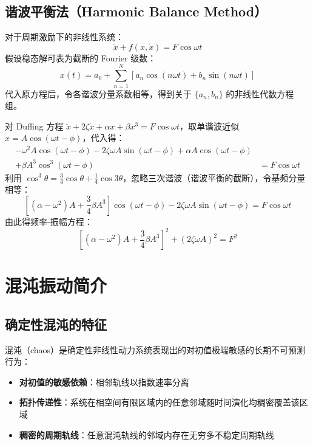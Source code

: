 \subsection{谐波平衡法（Harmonic Balance Method）}
对于周期激励下的非线性系统：
\[
\ddot{x} + f(x, \dot{x}) = F\cos\omega t
\]
假设稳态解可表为截断的 Fourier 级数：
\[
x(t) = a_0 + \sum_{n=1}^{N} \left[ a_n\cos(n\omega t) + b_n\sin(n\omega t) \right]
\]
代入原方程后，令各谐波分量系数相等，得到关于 $\{a_n, b_n\}$ 的非线性代数方程组。

\begin{myformula}
对 Duffing 方程 $\ddot{x} + 2\zeta\dot{x} + \alpha x + \beta x^{3} = F\cos\omega t$，取单谐波近似 $x = A\cos(\omega t - \phi)$，代入得：
\begin{align*}
-\omega^{2}A\cos(\omega t - \phi) - 2\zeta\omega A\sin(\omega t - \phi) + \alpha A\cos(\omega t - \phi) & \\
+ \beta A^{3}\cos^{3}(\omega t - \phi) &= F\cos\omega t
\end{align*}
利用 $\cos^{3}\theta = \frac{3}{4}\cos\theta + \frac{1}{4}\cos3\theta$，忽略三次谐波（谐波平衡的截断），令基频分量相等：
$$\left[(\alpha - \omega^{2})A + \frac{3}{4}\beta A^{3}\right]\cos(\omega t - \phi) - 2\zeta\omega A \sin(\omega t - \phi) = F\cos\omega t$$
由此得频率-振幅方程：
$$\left[(\alpha - \omega^{2})A + \frac{3}{4}\beta A^{3}\right]^{2} + (2\zeta\omega A)^{2} = F^{2}$$
\end{myformula}

\section{混沌振动简介}
\subsection{确定性混沌的特征}
混沌（chaos）是确定性非线性动力系统表现出的对初值极端敏感的长期不可预测行为：
\begin{itemize}
    \item \textbf{对初值的敏感依赖}：相邻轨线以指数速率分离
    \item \textbf{拓扑传递性}：系统在相空间有限区域内的任意邻域随时间演化均稠密覆盖该区域
    \item \textbf{稠密的周期轨线}：任意混沌轨线的邻域内存在无穷多不稳定周期轨线
\end{itemize}

